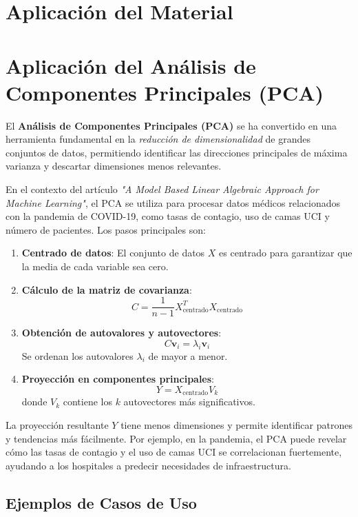 \documentclass[12pt]{article}
\begin{document}
\newpage
\section{Aplicación del Material}

\section*{Aplicación del Análisis de Componentes Principales (PCA)}

\noindent
El \textbf{Análisis de Componentes Principales (PCA)} se ha convertido en una herramienta fundamental en la \emph{reducción de dimensionalidad} de grandes conjuntos de datos, permitiendo identificar las direcciones principales de máxima varianza y descartar dimensiones menos relevantes.

\vspace{1em}
\noindent
En el contexto del artículo \emph{"A Model Based Linear Algebraic Approach for Machine Learning"}, el PCA se utiliza para procesar datos médicos relacionados con la pandemia de COVID-19, como tasas de contagio, uso de camas UCI y número de pacientes. Los pasos principales son:

\begin{enumerate}
	\item \textbf{Centrado de datos}: El conjunto de datos \( X \) es centrado para garantizar que la media de cada variable sea cero.
	\item \textbf{Cálculo de la matriz de covarianza}:
	\[
	C = \frac{1}{n-1} X_{\text{centrado}}^T X_{\text{centrado}}
	\]
	\item \textbf{Obtención de autovalores y autovectores}: 
	\[
	C \mathbf{v}_i = \lambda_i \mathbf{v}_i
	\]
	Se ordenan los autovalores \(\lambda_i\) de mayor a menor.
	\item \textbf{Proyección en componentes principales}:
	\[
	Y = X_{\text{centrado}} V_k
	\]
	donde \( V_k \) contiene los \( k \) autovectores más significativos.
\end{enumerate}

\vspace{1em}
\noindent
La proyección resultante \( Y \) tiene menos dimensiones y permite identificar patrones y tendencias más fácilmente. Por ejemplo, en la pandemia, el PCA puede revelar cómo las tasas de contagio y el uso de camas UCI se correlacionan fuertemente, ayudando a los hospitales a predecir necesidades de infraestructura.

\subsection*{Ejemplos de Casos de Uso}
\end{document}
